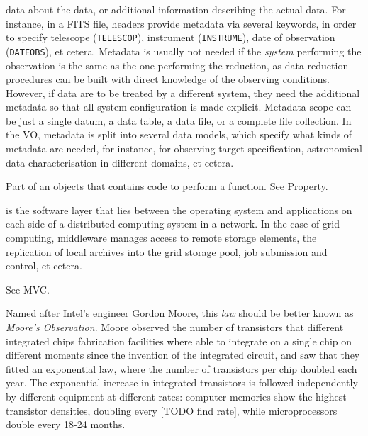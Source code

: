 {
    	data about the data, or additional information describing the
        actual data. For instance, in a \gls{FITS} file, headers
        provide metadata via several keywords, in order to specify
        telescope (\texttt{TELESCOP}), instrument (\texttt{INSTRUME}),
        date of observation (\texttt{DATEOBS}), et cetera. Metadata is
        usually not needed if the \emph{system} performing the
        observation is the same as the one performing the reduction, as
        data \gls{reduction} procedures can be built with direct
        knowledge of the observing conditions. However, if data are to
        be treated by a different system, they need the additional
        metadata so that all system configuration is made explicit.
        Metadata scope can be just a single datum, a data table, a data
        file, or a complete file collection. In the \gls{VO}, metadata
        is split into several data models, which specify what kinds of
        metadata are needed, for instance, for observing target
        specification, astronomical data characterisation in different
        domains, et cetera.
}

{
    	Part of an objects that contains code to perform a function.
        See \gls{Property}.
}

{
    	is the software layer that lies between the operating system
        and applications on each side of a distributed computing system
        in a network. In the case of \gls{grid computing}, middleware
        manages access to remote storage elements, the replication of
        local archives into the grid storage pool, job submission and
        control, et cetera.
}

{
    	See \gls{MVC}.
}

{
    	Named after Intel's engineer Gordon Moore, this \emph{law}
        should be better known as \emph{Moore's Observation}. Moore
        observed the number of transistors that different integrated
        chips fabrication facilities where able to integrate on a
        single chip on different moments since the invention of the
        integrated circuit, and saw that they fitted an exponential
        law, where the number of transistors per chip doubled each
        year. The exponential increase in integrated transistors is
        followed independently by different equipment at different
        rates: computer memories show the highest transistor densities,
        doubling every [TODO find rate], while microprocessors double
        every 18-24 months.
}

